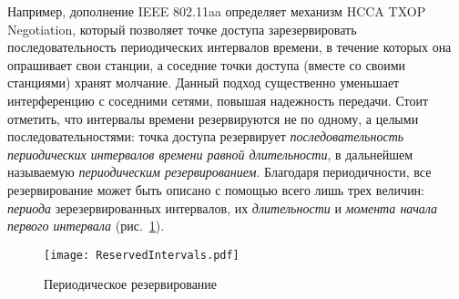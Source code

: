 Например, дополнение IEEE 802.11aa определяет механизм HCCA TXOP Negotiation, который позволяет точке доступа зарезервировать последовательность периодических интервалов времени, в течение которых она опрашивает свои станции, а соседние точки доступа (вместе со своими станциями) хранят молчание.  Данный подход существенно уменьшает интерференцию с соседними сетями, повышая надежность передачи. Стоит отметить, что интервалы времени резервируются не по одному, а целыми последовательностями: точка доступа резервирует \textit{последовательность периодических интервалов времени равной длительности}, в дальнейшем называемую \textit{периодическим резервированием}. Благодаря периодичности, все резервирование может быть описано с помощью всего лишь трех величин: \textit{периода} зерезервированных интервалов, их \textit{длительности} и \textit{момента начала первого интервала} (рис.~\ref{fig:periodic_reservation}).

\begin{figure}[h]
\texttt{[image: ReservedIntervals.pdf]}
\caption{\label{fig:periodic_reservation} Периодическое резервирование}
\end{figure} 



